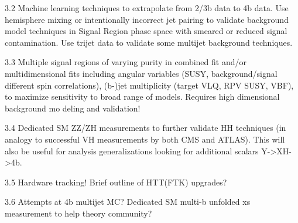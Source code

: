 3.2 Machine learning techniques to extrapolate from 2/3b data to 4b data. Use hemisphere mixing or intentionally incorrect jet pairing to validate background model techniques in Signal Region phase space with smeared or reduced signal contamination. Use trijet data to validate some multijet background techniques. 

3.3 Multiple signal regions of varying purity in combined fit and/or multidimensional fits including angular variables (SUSY, background/signal different spin correlations), (b-)jet multiplicity (target VLQ, RPV SUSY, VBF), to maximize sensitivity to broad range of models. Requires high dimensional background mo
deling and validation! 

3.4 Dedicated SM ZZ/ZH measurements to further validate HH techniques (in analogy to successful VH measurements by both CMS and ATLAS). This will also be useful for analysis generalizations looking for additional scalars Y->XH->4b. 

3.5 Hardware tracking! Brief outline of HTT(FTK) upgrades? 

3.6 Attempts at 4b multijet MC? Dedicated SM multi-b unfolded xs measurement to help theory community?
        



